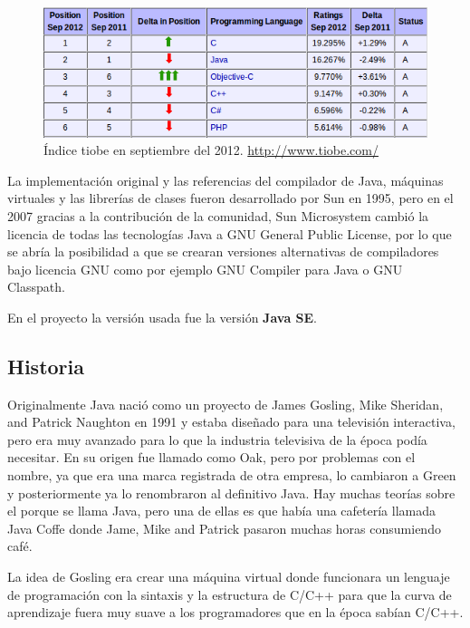 \begin{figure}[h]
  \centering
    \includegraphics[scale=0.9]{./ConocimientosPrevios/imagenes/indiceTiobe.png}
  \caption{Índice tiobe en septiembre del 2012. \url{http://www.tiobe.com/}}
  \label{fig:indicetiobe}
\end{figure} 

La implementación original y las referencias del compilador de Java, máquinas virtuales y las librerías de clases fueron desarrollado por Sun en 1995, pero en el 2007 gracias a la contribución de la comunidad, Sun Microsystem cambió la licencia de todas las tecnologías Java a GNU General Public License, por lo que se abría la posibilidad a que se crearan versiones alternativas de compiladores bajo licencia GNU como por ejemplo GNU Compiler para Java o GNU Classpath.

En el proyecto la versión usada fue la versión \textbf{Java SE}.

\subsection{Historia}

Originalmente Java nació como un proyecto de James Gosling, Mike Sheridan, and Patrick Naughton en 1991 y estaba diseñado para una televisión interactiva, pero era muy avanzado para lo que la industria televisiva de la época podía necesitar. En su origen fue llamado como Oak, pero por problemas con el nombre, ya que era una marca registrada de otra empresa, lo cambiaron a Green y posteriormente ya lo renombraron al definitivo Java. Hay muchas teorías sobre el porque se llama Java, pero una de ellas es que había una cafetería llamada Java Coffe donde Jame, Mike and Patrick pasaron muchas horas consumiendo café.

La idea de Gosling era crear una máquina virtual donde funcionara un lenguaje de programación con la sintaxis y la estructura de C/C++ para que la curva de aprendizaje fuera muy suave a los programadores que en la época sabían C/C++.

